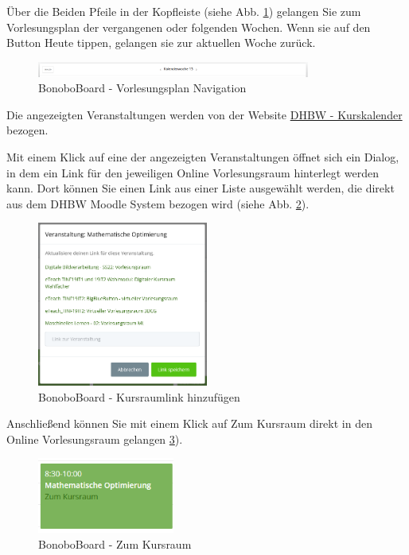\documentclass[a4paper,11pt]{scrartcl}
\begin{document}
\noindent Über die Beiden Pfeile in der Kopfleiste (siehe Abb. \ref{img:lecture_nav}) gelangen Sie zum Vorlesungsplan der vergangenen oder folgenden Wochen. Wenn sie auf den Button \frqq{}Heute\flqq{} tippen, gelangen sie zur aktuellen Woche zurück.

\begin{figure}[H]
	\begin{center}
		\includegraphics[width=0.8\textwidth]{lecture_nav}
		\caption{BonoboBoard - Vorlesungsplan Navigation}
		\label{img:lecture_nav}
	\end{center}
\end{figure}

\noindent Die angezeigten Veranstaltungen werden von der Website \frqq{}\href{https://vorlesungsplan.dhbw-mannheim.de/index.php}{DHBW - Kurskalender}\flqq{} bezogen.

\bigskip
Mit einem Klick auf eine der angezeigten Veranstaltungen öffnet sich ein Dialog, in dem ein Link für den jeweiligen Online Vorlesungsraum hinterlegt werden kann. Dort können Sie einen Link aus einer Liste ausgewählt werden, die direkt aus dem DHBW Moodle System bezogen wird (siehe Abb. \ref{img:Moodle_link}).

\begin{figure}[H]
	\begin{center}
		\includegraphics[width=0.5\textwidth]{Moodle_link}
		\caption{BonoboBoard - Kursraumlink hinzufügen}
		\label{img:Moodle_link}
	\end{center}
\end{figure}

\noindent Anschließend können Sie mit einem Klick auf \frqq{}Zum Kursraum\flqq{} direkt in den Online Vorlesungsraum gelangen \ref{img:Kursraum}).

\begin{figure}[H]
	\begin{center}
		\includegraphics[width=0.4\textwidth]{Kursraum}
		\caption{BonoboBoard - Zum Kursraum}
		\label{img:Kursraum}
	\end{center}
\end{figure}
\end{document}
